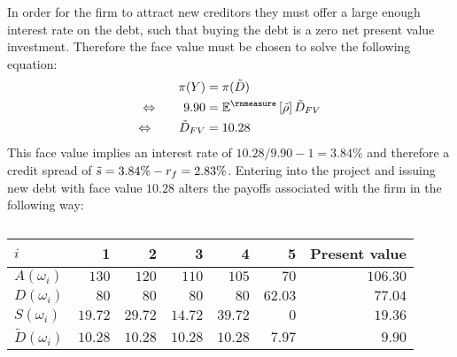 \documentclass[main.tex]{subfiles}
\begin{document}
        In order for the firm to attract new creditors they must offer a large enough interest rate on the debt, such that buying the debt is a zero net present value investment.
        Therefore the face value must be chosen to solve the following equation:
            \begin{align}
                \pi(Y) &= \pi(\tilde{D}) \\
                \Leftrightarrow  \qquad
                9.90 &= \mathbb{E}^{\rnmeasure}\left[\tilde{\rho}\right] \tilde{D}_{FV} \\
                \Leftrightarrow  \qquad
                \tilde{D}_{FV} &= 10.28
            \end{align}
        This face value implies an interest rate of $10.28 / 9.90 - 1 = 3.84\%$
        and therefore a credit spread of $\tilde{s} = 3.84\% - r_{f} = 2.83\%$.
        Entering into the project and issuing new debt with face value $10.28$ alters the payoffs associated with the firm in the following way:
        \begin{table}[H]
            \centering
            \begin{tabular}{l|rrrrr||r}
                $i$ & 1 & 2 & 3 & 4 & 5 & Present value \\
                \hline
                $A(\omega_{i})$ & $130$ & $120$ & $110$ & $105$ & $70$ & $106.30$ \\
                $D(\omega_{i})$ & $80$ & $80$ & $80$ & $80$ & $62.03$ & $77.04$ \\
                $S(\omega_{i})$ & $19.72$ & $29.72$ & $14.72$ & $39.72$ & $0$ & $19.36$ \\
                $\tilde{D}(\omega_{i})$ & $10.28$ & $10.28$ & $10.28$ & $10.28$ & $7.97$ & $9.90$ \\
            \end{tabular}
            \caption{}
        \end{table}
\end{document}
